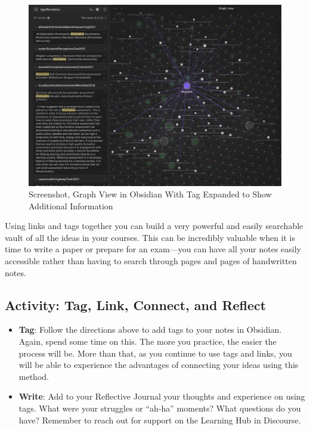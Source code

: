\documentclass[
  letterpaper,
  DIV=11,
  numbers=noendperiod]{scrreprt}
\providecommand{\tightlist}{%
  \setlength{\itemsep}{0pt}\setlength{\parskip}{0pt}}\usepackage{longtable,booktabs,array}
\begin{document}
\begin{figure}

\caption{\label{fig-graph3}Screenshot, Graph View in Obsidian With Tag
Expanded to Show Additional Information}

\includegraphics{assets/u3/graph3.png}

\end{figure}%

Using links and tags together you can build a very powerful and easily
searchable vault of all the ideas in your courses. This can be
incredibly valuable when it is time to write a paper or prepare for an
exam---you can have all your notes easily accessible rather than having
to search through pages and pages of handwritten notes.

\subsection{Activity: Tag, Link, Connect, and
Reflect}\label{activity-tag-link-connect-and-reflect}

\begin{tcolorbox}[enhanced jigsaw, toprule=.15mm, colback=white, colframe=quarto-callout-note-color-frame, bottomtitle=1mm, leftrule=.75mm, coltitle=black, titlerule=0mm, rightrule=.15mm, colbacktitle=quarto-callout-note-color!10!white, left=2mm, title={Learning Activity}, opacitybacktitle=0.6, opacityback=0, breakable, toptitle=1mm, arc=.35mm, bottomrule=.15mm]

\begin{itemize}
\tightlist
\item
  \textbf{Tag}: Follow the directions above to add tags to your notes in
  Obsidian. Again, spend some time on this. The more you practice, the
  easier the process will be. More than that, as you continue to use
  tags and links, you will be able to experience the advantages of
  connecting your ideas using this method.
\item
  \textbf{Write}: Add to your Reflective Journal your thoughts and
  experience on using tags. What were your struggles or ``ah-ha''
  moments? What questions do you have? Remember to reach out for support
  on the Learning Hub in Discourse.
\end{itemize}

\end{tcolorbox}
\end{document}
